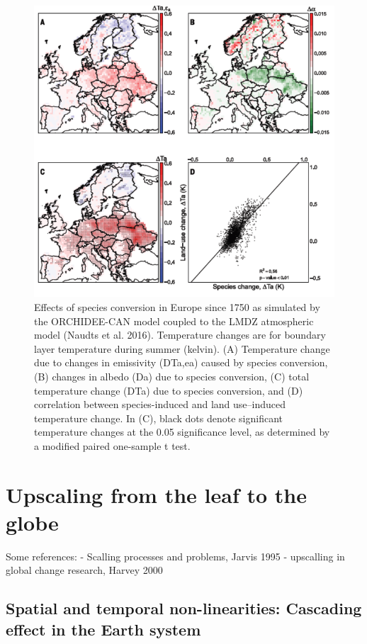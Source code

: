 \documentclass[12pt,oneside]{book}
\begin{document}
\begin{figure}

{\centering \includegraphics[width=0.8\linewidth]{figures/chap8/f817_naudts2} 

}

\caption{Effects of species conversion in Europe since 1750 as simulated by the ORCHIDEE-CAN model coupled to the LMDZ atmospheric model (Naudts et al. 2016). Temperature changes are for boundary layer temperature during summer (kelvin). (A) Temperature change due to changes in emissivity (DTa,ea) caused by species conversion, (B) changes in albedo (Da) due to species conversion, (C) total temperature change (DTa) due to species conversion, and (D) correlation between species-induced and land use–induced temperature change. In (C), black dots denote significant temperature changes at the 0.05 significance level, as determined by a modified paired one-sample t test.}\label{fig:f817}
\end{figure}

\chapter{Upscaling from the leaf to the
globe}\label{upscaling-from-the-leaf-to-the-globe}

 Some references: - Scalling processes and problems,
Jarvis 1995 - upscalling in global change research, Harvey 2000

\section{Spatial and temporal non-linearities: Cascading effect in the
Earth
system}\label{spatial-and-temporal-non-linearities-cascading-effect-in-the-earth-system}
\end{document}
